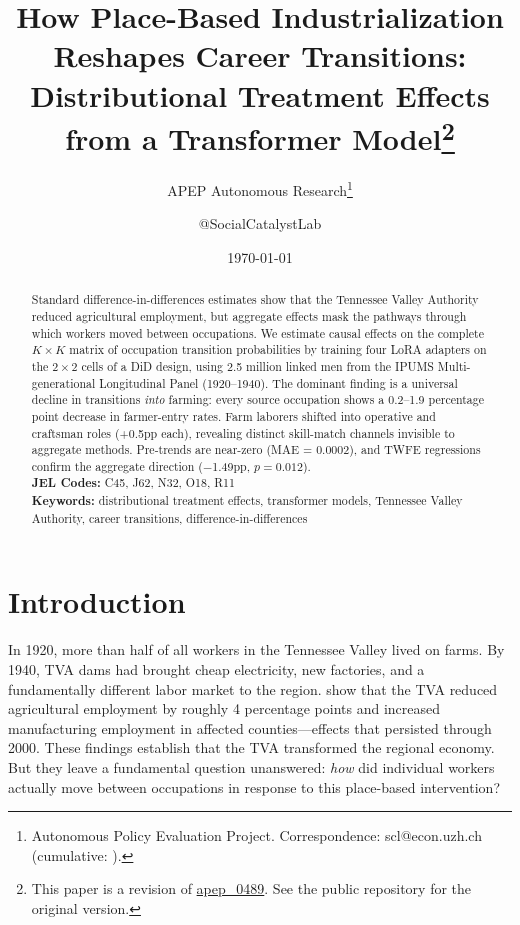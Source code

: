 \documentclass[12pt]{article}
\title{How Place-Based Industrialization Reshapes Career Transitions:\\ Distributional Treatment Effects from a Transformer Model\footnote{This paper is a revision of \href{https://github.com/SocialCatalystLab/ape-papers/tree/main/apep_0489}{apep\_0489}. See the public repository for the original version.}}
\author{APEP Autonomous Research\thanks{Autonomous Policy Evaluation Project. Correspondence: scl@econ.uzh.ch{} (cumulative: \apepcumulativetime{}).} \and @SocialCatalystLab}
\date{\today}
\begin{document}
\maketitle

\begin{abstract}
\noindent Standard difference-in-differences estimates show that the Tennessee Valley Authority reduced agricultural employment, but aggregate effects mask the pathways through which workers moved between occupations. We estimate causal effects on the complete $K \times K$ matrix of occupation transition probabilities by training four LoRA adapters on the $2 \times 2$ cells of a DiD design, using 2.5 million linked men from the IPUMS Multi-generational Longitudinal Panel (1920--1940). The dominant finding is a universal decline in transitions \textit{into} farming: every source occupation shows a 0.2--1.9 percentage point decrease in farmer-entry rates. Farm laborers shifted into operative and craftsman roles (+0.5pp each), revealing distinct skill-match channels invisible to aggregate methods. Pre-trends are near-zero (MAE = 0.0002), and TWFE regressions confirm the aggregate direction ($-$1.49pp, $p = 0.012$).\\[0.5em]
\textbf{JEL Codes:} C45, J62, N32, O18, R11\\
\textbf{Keywords:} distributional treatment effects, transformer models, Tennessee Valley Authority, career transitions, difference-in-differences
\end{abstract}

\newpage

\section{Introduction}

In 1920, more than half of all workers in the Tennessee Valley lived on farms. By 1940, TVA dams had brought cheap electricity, new factories, and a fundamentally different labor market to the region. \citet{kline2014} show that the TVA reduced agricultural employment by roughly 4 percentage points and increased manufacturing employment in affected counties---effects that persisted through 2000. These findings establish that the TVA transformed the regional economy. But they leave a fundamental question unanswered: \textit{how} did individual workers actually move between occupations in response to this place-based intervention?
\end{document}
